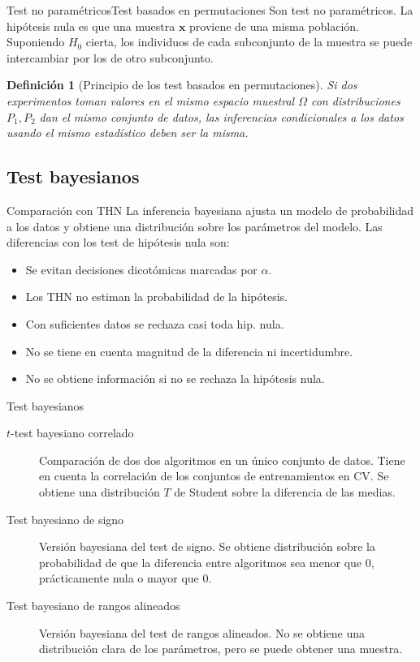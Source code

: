\documentclass[leqno]{beamer}
\theoremstyle{definition_wo_parentheses}
\newtheorem{definicion}{Definición}
\begin{document}
\begin{frame}{Test no paramétricos}{Test basados en permutaciones}
	Son test no paramétricos. La hipótesis nula es que una muestra $\mathbf{x}$ proviene de una misma población.\\
	Suponiendo $H_0$ cierta, los individuos de cada 
subconjunto de la muestra se puede intercambiar por los de 
otro subconjunto.
\begin{definicion}[Principio de los test basados en permutaciones] Si dos experimentos toman valores en el mismo
espacio muestral $\Omega$ con distribuciones $P_1, P_2$ dan
el mismo conjunto de datos, las inferencias condicionales
a los datos usando el mismo estadístico deben ser la misma.
\end{definicion}
\end{frame}


\subsection{Test bayesianos}
\begin{frame}{Comparación con THN}
	La inferencia bayesiana ajusta un modelo de probabilidad
a los datos y obtiene una distribución sobre los parámetros
del modelo. Las diferencias con los test de hipótesis nula son:

\begin{itemize}
\item Se evitan decisiones dicotómicas marcadas por $\alpha$.
\item Los THN no estiman la probabilidad de la hipótesis.
\item Con suficientes datos se rechaza casi toda hip. nula.
\item No se tiene en cuenta magnitud de la diferencia ni incertidumbre.
\item No se obtiene información si no se rechaza la hipótesis nula.
\end{itemize}

\end{frame}

\begin{frame}{Test bayesianos}
\begin{description}
\item[$t$-test bayesiano correlado] Comparación de dos
dos algoritmos en un único conjunto de datos. Tiene en cuenta
la correlación de los conjuntos de entrenamientos en CV.
Se obtiene una distribución $T$ de Student sobre la
diferencia de las medias.
\item[Test bayesiano de signo] Versión bayesiana del test de 
signo. Se obtiene distribución sobre la probabilidad de que 
la diferencia entre algoritmos sea menor que 0, prácticamente 
nula o mayor que 0.
\item[Test bayesiano de rangos alineados] Versión bayesiana 
del test de rangos alineados. No se obtiene una distribución clara de los parámetros, pero se puede obtener una muestra.
\end{description}
\end{frame}
\end{document}
